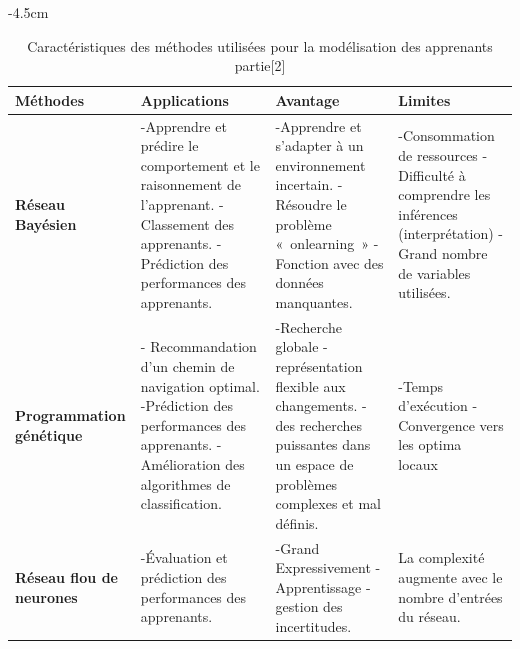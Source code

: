 \begin{table}[H]
	\centering
	\addtolength{\leftskip} {-4.5cm}
	\addtolength{\rightskip}{-4cm}
	\begin{tabular}{|m{3cm}|m{5cm}|m{5cm}|m{4cm}|}
	\hline
	\rowcolor{blueforest}
	\color{white} \textbf{Méthodes} & \color{white} \textbf{Applications} & \color{white} \textbf{Avantage} & \color{white} \textbf{Limites} \\
	\hline\hline
	  \textbf{Réseau Bayésien}  &
	  -Apprendre et prédire le comportement et le raisonnement de l'apprenant. \newline
	  -Classement des apprenants. \newline
	  -Prédiction des performances des apprenants.&
	  -Apprendre et s'adapter à un environnement incertain.\newline
	  -Résoudre le problème « onlearning » \newline
	  -Fonction avec des données manquantes.&
	  -Consommation de ressources \newline
	  -Difficulté à comprendre les inférences (interprétation) \newline
	  -Grand nombre de variables utilisées. \\ \hline
	  \textbf{Programmation génétique}  &
	  - Recommandation d'un chemin de navigation optimal. \newline
	  -Prédiction des performances des apprenants. \newline
	  -Amélioration des algorithmes de classification.&
	  -Recherche globale \newline
	  -représentation flexible aux changements. \newline
	  -des recherches puissantes dans un espace de problèmes complexes et mal définis.&
	  -Temps d'exécution \newline
	  -Convergence vers les optima locaux \\ \hline
	  \textbf{Réseau flou de neurones}  &
	  -Évaluation et prédiction des performances des apprenants.&
	  -Grand Expressivement \newline
	  -Apprentissage \newline
	  -gestion des incertitudes.&
	  La complexité augmente avec le nombre d'entrées du réseau. \\ \hline
	\end{tabular}
	\caption{Caractéristiques des méthodes utilisées pour la modélisation des apprenants partie[2]}
	\label{Caracteristiques_modelisation_apprenants2}
\end{table}

